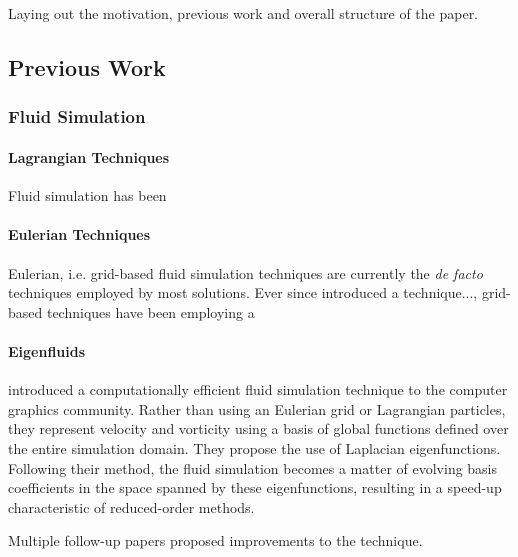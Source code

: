 \chapter{\bevezetes}

Laying out the motivation, previous work and overall structure of the paper.



\section{Previous Work}
\subsection{Fluid Simulation}
\subsubsection*{Lagrangian Techniques}
Fluid simulation has been 
\subsubsection*{Eulerian Techniques}
Eulerian, i.e. grid-based fluid simulation techniques are currently the
\textit{de facto} techniques employed by most solutions.
Ever since \todo{[cite]} introduced a technique..., grid-based techniques
have been employing a 

\subsubsection*{Eigenfluids}


\cite{dewitt} introduced a computationally efficient fluid simulation technique
to the computer graphics community. Rather than using an Eulerian grid or
Lagrangian particles, they represent velocity and vorticity using a basis of
global functions defined over the entire simulation domain. They propose the use
of Laplacian eigenfunctions. Following their method, the fluid simulation
becomes a matter of evolving basis coefficients in the space spanned by
these eigenfunctions, resulting in a speed-up characteristic of reduced-order
methods.

Multiple follow-up papers proposed improvements to the technique.

